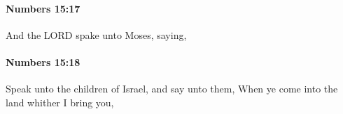 		\paragraph{Numbers 15:17} %
			\label{NUMBERS-15-17}

			And the LORD spake unto Moses, saying,


		\paragraph{Numbers 15:18} %
			\label{NUMBERS-15-18}

			Speak unto the children of Israel, and say unto them, When ye come into the land whither I bring you,


